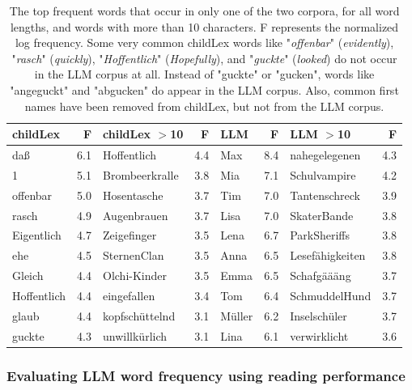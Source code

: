 \documentclass[manuscript]{stjour}
\begin{document}
\begin{table}[!htbp]
\caption{The top frequent words that occur in only one of the two corpora, for all word lengths, and words with more than 10 characters. F represents the normalized log frequency. Some very common childLex words like "\textit{offenbar}" (\textit{evidently}), "\textit{rasch}" (\textit{quickly}), "\textit{Hoffentlich}" (\textit{Hopefully}), and "\textit{guckte}" (\textit{looked}) do not occur in the LLM corpus at all. Instead of "guckte" or "gucken", words like "angeguckt" and "abgucken" do appear in the LLM corpus. Also, common first names have been removed from childLex, but not from the LLM corpus.}
\centering
\begin{tabular}{lrlrlrlr}
  \hline
childLex & F & childLex $>$10 & F & LLM & F & LLM $>$10 & F \\ 
  \hline
daß & 6.1 & Hoffentlich & 4.4 & Max & 8.4 & nahegelegenen & 4.3 \\ 
  1 & 5.1 & Brombeerkralle & 3.8 & Mia & 7.1 & Schulvampire & 4.2 \\ 
  offenbar & 5.0 & Hosentasche & 3.7 & Tim & 7.0 & Tantenschreck & 3.9 \\ 
  rasch & 4.9 & Augenbrauen & 3.7 & Lisa & 7.0 & SkaterBande & 3.8 \\ 
  Eigentlich & 4.7 & Zeigefinger & 3.5 & Lena & 6.7 & ParkSheriffs & 3.8 \\ 
  ehe & 4.5 & SternenClan & 3.5 & Anna & 6.5 & Lesefähigkeiten & 3.8 \\ 
  Gleich & 4.4 & Olchi-Kinder & 3.5 & Emma & 6.5 & Schafgäääng & 3.7 \\ 
  Hoffentlich & 4.4 & eingefallen & 3.4 & Tom & 6.4 & SchmuddelHund & 3.7 \\ 
  glaub & 4.4 & kopfschüttelnd & 3.1 & Müller & 6.2 & Inselschüler & 3.7 \\ 
  guckte & 4.3 & unwillkürlich & 3.1 & Lina & 6.1 & verwirklicht & 3.6 \\ 
   \hline
\end{tabular}
\label{notin}
\end{table}




\subsubsection*{Evaluating LLM word frequency using reading performance}
\end{document}
